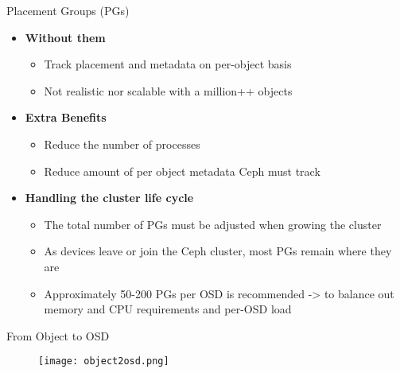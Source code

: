 \begin{frame}{Placement Groups (PGs)}
    \begin{itemize}
        \item \textbf{Without them}
            \begin{itemize}
                \item Track placement and metadata on per-object basis
                \item Not realistic nor scalable with a million++ objects
            \end{itemize}
        \item \textbf{Extra Benefits}
            \begin{itemize}
                \item Reduce the number of processes
                \item Reduce amount of per object metadata Ceph must track
            \end{itemize}
        \item \textbf{Handling the cluster life cycle}
            \begin{itemize}
                \item The total number of PGs must be adjusted when growing the cluster
                \item As devices leave or join the Ceph cluster, most PGs remain where they are
                \item Approximately 50-200 PGs per OSD is recommended -> to balance out memory and CPU requirements and per-OSD load
            \end{itemize}
    \end{itemize}
\end{frame}

\begin{frame}{From Object to OSD}
    \begin{figure}[htpb]
        \centering
        \texttt{[image: object2osd.png]}
    \end{figure}
\end{frame}
